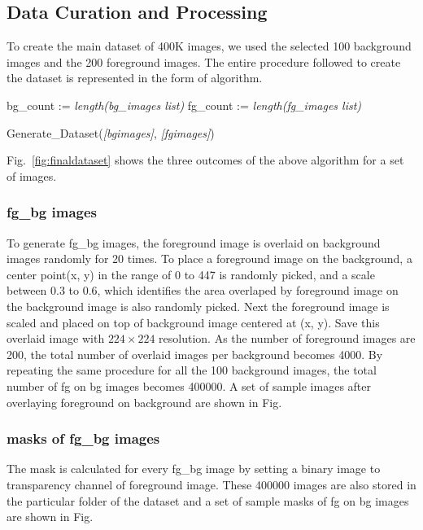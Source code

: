 \documentclass{article}
\begin{document}
\subsection{Data Curation and Processing}
To create the main dataset of 400K images, we used the selected 100 background images and the 200 foreground images. 
The entire procedure followed to create the dataset is represented in the form of algorithm. 

\begin{algorithm}[H]
\SetAlgoLined
{} 
bg\_count := \textit{length(bg\_images list)} \;
fg\_count := \textit{length(fg\_images list)} \;

\caption{Generate\_Dataset(\textit{[bgimages]}, \textit{[fgimages]})}
\end{algorithm}

Fig.~\ref{fig:finaldataset} shows the three outcomes of the above algorithm for a set of images.

\subsubsection{fg\_bg images}
To generate fg\_bg images, the foreground image is overlaid on background images randomly for 20 times. 
To place a foreground image on the background, a center point(x, y) in the range of 0 to 447 is randomly picked,
 and a scale between 0.3 to 0.6, which identifies the area overlaped by foreground image on the background image is also randomly picked. 
 Next the foreground image is scaled and placed on top of background image centered at (x, y). 
 Save this overlaid image with $224 \times 224$ resolution.   
 As the number of foreground images are 200, the total number of overlaid images per background becomes 4000. 
 By repeating the same procedure for all the 100 background images, the total number of fg on bg images becomes 400000. 
 A set of sample images after overlaying foreground on background are shown in Fig. 

\subsubsection{masks of fg\_bg images}
The mask is calculated for every fg\_bg image by setting a binary image to transparency channel of foreground image. 
These 400000 images are also stored in the particular folder of the dataset and a set of sample masks of fg on bg images are shown in Fig.  
\end{document}
